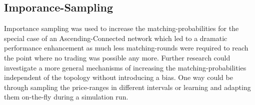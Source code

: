 \documentclass[Bachelorarbeit.tex]{subfiles}
\begin{document}
\subsection{Imporance-Sampling}
Importance sampling was used to increase the matching-probabilities for the special case of an Ascending-Connected network which led to a dramatic performance enhancement as much less matching-rounds were required to reach the point where no trading was possible any more. Further research could investigate a more general mechanisms of increasing the matching-probabilities independent of the topology without introducing a bias. One way could be through sampling the price-ranges in different intervals or learning and adapting them on-the-fly during a simulation run.
\end{document}

